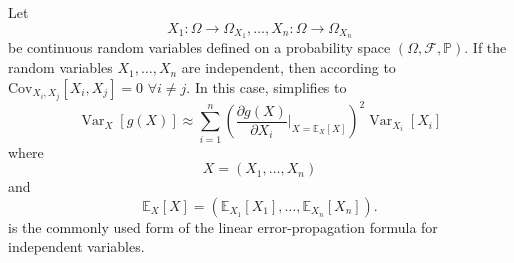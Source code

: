 \begin{remark}
	\label{remark:error_prop_independent}
	Let
	\begin{equation}
		X_1\colon\Omega \to \Omega_{X_1}, \dots, X_n\colon\Omega \to \Omega_{X_n}
	\end{equation}
	be continuous random variables defined on a probability space $(\Omega, \mathcal{F}, \mathbb{P})$.	If the random variables $X_1, \dots, X_n$ are independent, then according to  $\mathrm{Cov}_{X_i,X_j}[X_i, X_j] = 0$ $\forall i \neq j$. In this case,  simplifies to
	\begin{equation}
		\operatorname{Var}_{X}[g(X)] \approx \sum_{i=1}^n \left(\frac{\partial g(X)}{\partial X_i}\Big|_{X = \mathbb{E}_X[X]}\right)^2 \operatorname{Var}_{X_i}[X_i]
		\label{eq:error_prop}
	\end{equation}
	where 
	\begin{equation}
		X = (X_1, \dots, X_n)
	\end{equation}
	and
	\begin{equation}
		\mathbb{E}_X[X] = (\mathbb{E}_{X_1}[X_1], \dots, \mathbb{E}_{X_n}[X_n]).
	\end{equation}
	 is the commonly used form of the linear error-propagation formula for independent variables.
\end{remark}

